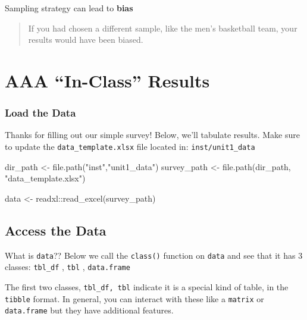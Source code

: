 \documentclass[
]{book}
\newenvironment{Shaded}{\begin{snugshade}}{\end{snugshade}}
\newcommand{\FunctionTok}[1]{\textcolor[rgb]{0.00,0.00,0.00}{#1}}
\newcommand{\NormalTok}[1]{#1}
\newcommand{\OtherTok}[1]{\textcolor[rgb]{0.56,0.35,0.01}{#1}}
\newcommand{\SpecialCharTok}[1]{\textcolor[rgb]{0.00,0.00,0.00}{#1}}
\newcommand{\StringTok}[1]{\textcolor[rgb]{0.31,0.60,0.02}{#1}}
\begin{document}
Sampling strategy can lead to \textbf{bias}

\begin{quote}
If you had chosen a different sample, like the men's basketball
team, your results would have been biased.
\end{quote}

\hypertarget{aaa-in-class-results}{%
\chapter*{AAA ``In-Class'' Results}\label{aaa-in-class-results}}

\hypertarget{load-the-data}{%
\subsection*{Load the Data}\label{load-the-data}}

Thanks for filling out our simple survey! Below, we'll tabulate results. Make sure to update the \texttt{data\_template.xlsx} file located in: \texttt{inst/unit1\_data}

\begin{Shaded}
\begin{Highlighting}[]
\NormalTok{dir\_path }\OtherTok{\textless{}{-}} \FunctionTok{file.path}\NormalTok{(}\StringTok{"inst"}\NormalTok{,}\StringTok{"unit1\_data"}\NormalTok{)}
\NormalTok{survey\_path }\OtherTok{\textless{}{-}} \FunctionTok{file.path}\NormalTok{(dir\_path, }\StringTok{"data\_template.xlsx"}\NormalTok{)}

\NormalTok{data }\OtherTok{\textless{}{-}}\NormalTok{ readxl}\SpecialCharTok{::}\FunctionTok{read\_excel}\NormalTok{(survey\_path)}
\end{Highlighting}
\end{Shaded}

\hypertarget{access-the-data}{%
\section*{Access the Data}\label{access-the-data}}

What is \texttt{data}?? Below we call the \texttt{class()} function on \texttt{data} and see that it has 3 classes:
\texttt{tbl\_df} , \texttt{tbl} , \texttt{data.frame}

The first two classes, \texttt{tbl\_df,\ tbl} indicate it is a special kind of table, in the \texttt{tibble} format. In general, you can interact with these like a \texttt{matrix} or \texttt{data.frame} but they have additional features.
\end{document}
